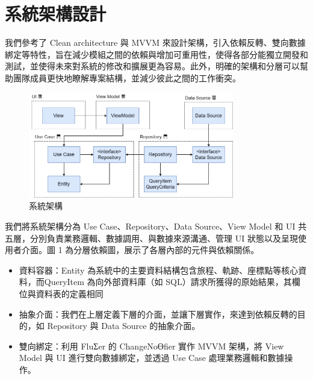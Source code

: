 \section{系統架構設計}

我們參考了 Clean architecture 與 MVVM 來設計架構，引入依賴反轉、雙向數據綁定等特性，旨在減少模組之間的依賴與增加可重用性，使得各部分能獨立開發和測試，並使得未來對系統的修改和擴展更為容易。此外，明確的架構和分層可以幫助團隊成員更快地瞭解專案結構，並減少彼此之間的工作衝突。

\begin{figure}[H]
  \centering
  \includegraphics[width=0.8\textwidth]{../assets/TT分層依賴圖.png}
  \caption{系統架構}
  \label{fig:sysarc}
\end{figure}

我們將系統架構分為 Use Case、Repository、Data Source、View Model 和 UI 共五層，分別負責業務邏輯、數據調用、與數據來源溝通、管理 UI 狀態以及呈現使用者介面。圖 1 為分層依賴圖，展示了各層內部的元件與依賴關係。

\begin{itemize}
  \item 資料容器：Entity 為系統中的主要資料結構包含旅程、軌跡、座標點等核心資料，而QueryItem 為向外部資料庫（如 SQL）請求所獲得的原始結果，其欄位與資料表的定義相同
  \item 抽象介面：我們在上層定義下層的介面，並讓下層實作，來達到依賴反轉的目的，如 Repository 與 Data Source 的抽象介面。
  \item 雙向綁定：利用 FluƩer 的 ChangeNoƟfier 實作 MVVM 架構，將 View Model 與 UI 進行雙向數據綁定，並透過 Use Case 處理業務邏輯和數據操作。
\end{itemize}